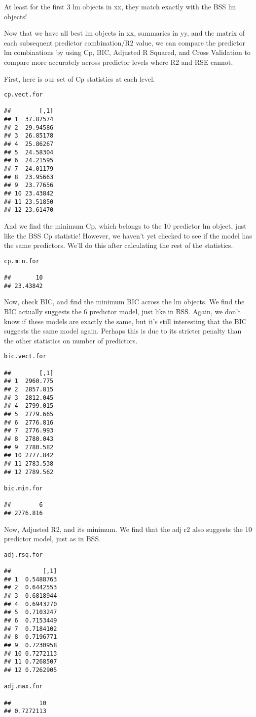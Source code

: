 \documentclass[]{article}
\begin{document}
At least for the first 3 lm objects in xx, they match exactly with the
BSS lm objects!

Now that we have all best lm objects in xx, summaries in yy, and the
matrix of each subsequent predictor combination/R2 value, we can compare
the predictor lm combinations by using Cp, BIC, Adjusted R Squared, and
Cross Validation to compare more accurately across predictor levels
where R2 and RSE cannot.

First, here is our set of Cp statistics at each level.

\begin{verbatim}
cp.vect.for

##        [,1]
## 1  37.87574
## 2  29.94586
## 3  26.85178
## 4  25.86267
## 5  24.58304
## 6  24.21595
## 7  24.01179
## 8  23.95663
## 9  23.77656
## 10 23.43842
## 11 23.51850
## 12 23.61470
\end{verbatim}

And we find the minimum Cp, which belongs to the 10 predictor lm object,
just like the BSS Cp statistic! However, we haven't yet checked to see
if the model has the same predictors. We'll do this after calculating
the rest of the statistics.

\begin{verbatim}
cp.min.for

##       10 
## 23.43842
\end{verbatim}

Now, check BIC, and find the minimum BIC across the lm objects. We find
the BIC actually suggests the 6 predictor model, just like in BSS.
Again, we don't know if these models are exactly the same, but it's
still interesting that the BIC suggests the same model again. Perhaps
this is due to its stricter penalty than the other statistics on number
of predictors.

\begin{verbatim}
bic.vect.for

##        [,1]
## 1  2960.775
## 2  2857.815
## 3  2812.045
## 4  2799.015
## 5  2779.665
## 6  2776.816
## 7  2776.993
## 8  2780.043
## 9  2780.582
## 10 2777.842
## 11 2783.538
## 12 2789.562

bic.min.for

##        6 
## 2776.816
\end{verbatim}

Now, Adjusted R2, and its minimum. We find that the adj r2 also suggests
the 10 predictor model, just as in BSS.

\begin{verbatim}
adj.rsq.for

##         [,1]
## 1  0.5488763
## 2  0.6442553
## 3  0.6818944
## 4  0.6943270
## 5  0.7103247
## 6  0.7153449
## 7  0.7184102
## 8  0.7196771
## 9  0.7230958
## 10 0.7272113
## 11 0.7268507
## 12 0.7262905

adj.max.for

##        10 
## 0.7272113
\end{verbatim}
\end{document}
